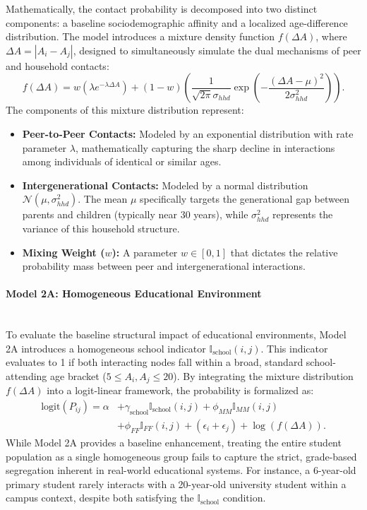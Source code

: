 Mathematically, the contact probability is decomposed into two distinct components: a baseline sociodemographic affinity and a localized age-difference distribution. The model introduces a mixture density function $f(\Delta A)$, where $\Delta A = |A_i - A_j|$, designed to simultaneously simulate the dual mechanisms of peer and household contacts:
\begin{equation} \label{eq:m2_mixture}
    f(\Delta A) = w \left( \lambda e^{-\lambda \Delta A} \right) + (1-w) \left( \frac{1}{\sqrt{2\pi}\sigma_{hhd}} \exp \left( -\frac{(\Delta A-\mu)^2}{2\sigma_{hhd}^2} \right) \right).
\end{equation}
The components of this mixture distribution represent:
\begin{itemize}
    \item \textbf{Peer-to-Peer Contacts:} Modeled by an exponential distribution with rate parameter $\lambda$, mathematically capturing the sharp decline in interactions among individuals of identical or similar ages.
    \item \textbf{Intergenerational Contacts:} Modeled by a normal distribution $\mathcal{N}(\mu, \sigma_{hhd}^2)$. The mean $\mu$ specifically targets the generational gap between parents and children (typically near 30 years), while $\sigma_{hhd}^2$ represents the variance of this household structure.
    \item \textbf{Mixing Weight ($w$):} A parameter $w \in [0, 1]$ that dictates the relative probability mass between peer and intergenerational interactions.
\end{itemize}

\paragraph*{Model 2A: Homogeneous Educational Environment}\mbox{}\\
To evaluate the baseline structural impact of educational environments, Model 2A introduces a homogeneous school indicator $\mathbb{I}_{\text{school}}(i, j)$.
This indicator evaluates to 1 if both interacting nodes fall within a broad, standard school-attending age bracket ($5 \le A_i, A_j \le 20$).
By integrating the mixture distribution $f(\Delta A)$ into a logit-linear framework, the probability is formalized as:
\begin{equation} \label{eq:m2a_logit}
\begin{aligned}
    \text{logit}(P_{ij}) = \alpha &+ \gamma_{\text{school}} \mathbb{I}_{\text{school}}(i, j) + \phi_{MM} \mathbb{I}_{MM}(i, j) \\
    &+ \phi_{FF} \mathbb{I}_{FF}(i, j) + (\epsilon_i + \epsilon_j) + \log(f(\Delta A)).
\end{aligned}
\end{equation}
While Model 2A provides a baseline enhancement, treating the entire student population as a single homogeneous group fails to capture the strict, grade-based segregation inherent in real-world educational systems. For instance, a 6-year-old primary student rarely interacts with a 20-year-old university student within a campus context, despite both satisfying the $\mathbb{I}_{\text{school}}$ condition.

